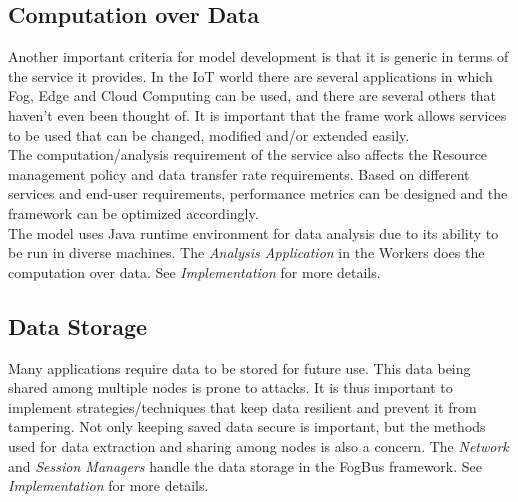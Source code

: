 \documentclass[10pt,journal,compsoc]{IEEEtran}
\begin{document}
\subsection{Computation over Data}
Another important criteria for model development is that it is generic in terms of the service it provides. In the IoT world there are several applications in which Fog, Edge and Cloud Computing can be used, and there are several others that haven’t even been thought of. It is important that the frame work allows services to be used that can be changed, modified and/or extended easily. \\
The computation/analysis requirement of the service also affects the Resource management policy and data transfer rate requirements. Based on different services and end-user requirements, performance metrics can be designed and the framework can be optimized accordingly.\\
The model uses Java runtime environment for data analysis due to its ability to be run in diverse machines. The \textit{Analysis Application} in the Workers does the computation over data. See \textit{Implementation} for more details.

\subsection{Data Storage}
Many applications require data to be stored for future use. This data being shared among multiple nodes is prone to attacks. It is thus important to implement strategies/techniques that keep data resilient and prevent it from tampering. Not only keeping saved data secure is important, but the methods used for data extraction and sharing among nodes is also a concern. The \textit{Network} and \textit{Session Managers} handle the data storage in the FogBus framework. See \textit{Implementation} for more details.
\end{document}
